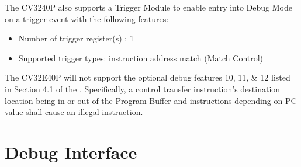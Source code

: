 \documentclass[letterpaper,10pt,english]{sphinxmanual}
\begin{document}
\sphinxAtStartPar
The CV3240P also supports a Trigger Module to enable entry into Debug Mode on a trigger event with the following features:
\begin{itemize}
\item {} 
\sphinxAtStartPar
Number of trigger register(s) : 1

\item {} 
\sphinxAtStartPar
Supported trigger types: instruction address match (Match Control)

\end{itemize}

\sphinxAtStartPar
The CV32E40P will not support the optional debug features 10, 11, \& 12 listed in Section 4.1 of the .
Specifically, a control transfer instruction’s destination location being in or out of the Program Buffer and instructions depending on PC value shall  cause an illegal instruction.


\section{Debug Interface}
\label{\detokenize{debug:debug-interface}}
\end{document}
